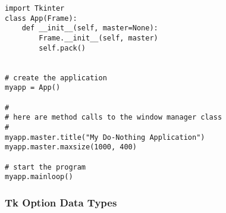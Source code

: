 \begin{verbatim}
import Tkinter
class App(Frame):
    def __init__(self, master=None):
        Frame.__init__(self, master)
        self.pack()


# create the application
myapp = App()

#
# here are method calls to the window manager class
#
myapp.master.title("My Do-Nothing Application")
myapp.master.maxsize(1000, 400)

# start the program
myapp.mainloop()
\end{verbatim}


\subsubsection{Tk Option Data Types} %


